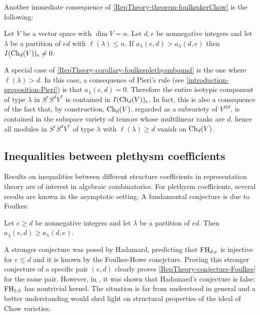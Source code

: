 Another immediate consequence of \ref{RepTheory-theorem-foulkeskerChow} is the following:
\begin{corollary}
\label{RepTheory-corollary-foulkesplethysmbound}
Let $V$ be a vector space with $\dim V =n$. Let $d,e$ be nonnegative integers and let $\lambda$ be a partition of $ed$ with $\ell(\lambda) \leq n$. If $a_\lambda(e,d) > a_\lambda(d,e)$ then $I(\mathrm{Ch}_d(V))_e \neq 0$.
\end{corollary}
A special case of \ref{RepTheory-corollary-foulkesplethysmbound} is the one where $\ell(\lambda) > d$. In this case, a consequence of Pieri's rule (see \ref{introduction-proposition-Pieri}) is that $a_\lambda(e,d) = 0$. Therefore the entire isotypic component of type $\lambda$ in $S^e S^d V^*$ is contained in $I(\mathrm{Ch}_d(V))_e$. In fact, this is also a consequence of the fact that, by construction, $\mathrm{Ch}_d(V)$, regarded as a subvariety of $V^{\otimes d}$, is contained in the subspace variety of tensors whose multilinear ranks are $d$, hence all modules in $S^eS^d V^*$ of type $\lambda$ with $\ell(\lambda) \geq d$ vanish on $\mathrm{Ch}_d(V)$.

\subsection{Inequalities between plethysm coefficients}
\label{RepTheory-subsection-plethysmInequalities}
Results on inequalities between different structure coefficients in representation theory are of interest in algebraic combinatorics. For plethysm coefficients, several results are known in the asymptotic setting. A fundamental conjecture is due to Foulkes:
\begin{conjecture}
 \label{RepTheory-conjecture-Foulkes}
 Let $e \geq d$ be nonnegative integers and let $\lambda$ be a partition of $ed$. Then $a_\lambda (e,d) \geq a_\lambda(d,e)$.
\end{conjecture}
A stronger conjecture was posed by Hadamard, predicting that $\mathrm{FH}_{d,e}$ is injective for $e \leq d$ and it is known by the Foulkes-Howe conejcture. Proving this stronger conjecture of a specific pair $(e,d)$ clearly proves \ref{RepTheory-conjecture-Foulkes} for the same pair. However, in \cite{MN05}, it was shown that Hadamard's conjecture is false: $\mathrm{FH}_{5,5}$ has nontrivial kernel. The situation is far from understood in general and a better understanding would shed light on structural properties of the ideal of Chow varieties.


